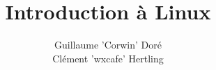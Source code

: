 \documentclass[12pt]{beamer}
\title{Introduction à Linux}
\author{
    Guillaume 'Corwin' Doré\\
    Clément 'wxcafe' Hertling\\
}
\begin{document}
    \begin{frame}
        \maketitle
    \end{frame}
    
    \begin{frame}
    	\tableofcontents
    \end{frame}
    
    
    
    
    
    
\end{document}
